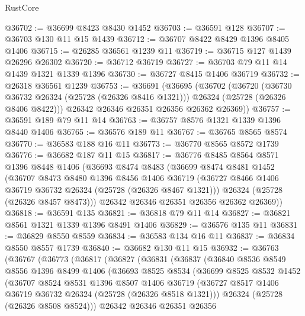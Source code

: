 \begin{lexlean}{RustCore}
\begin{coremodule}
@36702 := @36699 @8423 @8430 @1452
@36703 := @36591 @128
@36707 := @36703 @130 @11 @15 @1439
@36712 := @36707 @8422 @8429 @1396 @8405 @1406
@36715 := @26285 @36561 @1239 @11
@36719 := @36715 @127 @1439 @26296 @26302
@36720 := @36712 @36719
@36727 := @36703 @79 @11 @14 @1439 @1321 @1339 @1396
@36730 := @36727 @8415 @1406 @36719
@36732 := @26318 @36561 @1239
@36753 := @36691
    (@36695
      (@36702
        (@36720
          (@36730 @36732 @26324 (@25728 (@26326 @8416 @1321)))
          @26324
          (@25728 (@26326 @8406 @8422)))
        @26342
        @26346
        @26351
        @26356
        @26362
        @26369))
@36757 := @36591 @189 @79 @11 @14
@36763 := @36757 @8576 @1321 @1339 @1396 @8440 @1406
@36765 := @36576 @189 @11
@36767 := @36765 @8565 @8574
@36770 := @36583 @188 @16 @11
@36773 := @36770 @8565 @8572 @1739
@36776 := @36682 @187 @11 @15
@36817 := @36776
    @8485
    @8564
    @8571
    @1396
    @8448
    @1406
    (@36693
      @8474
      @8483
      (@36699
        @8474
        @8481
        @1452
        (@36707
          @8473
          @8480
          @1396
          @8456
          @1406
          @36719
          (@36727 @8466 @1406 @36719 @36732 @26324 (@25728 (@26326 @8467 @1321)))
          @26324
          (@25728 (@26326 @8457 @8473)))
        @26342
        @26346
        @26351
        @26356
        @26362
        @26369))
@36818 := @36591 @135
@36821 := @36818 @79 @11 @14
@36827 := @36821 @8561 @1321 @1339 @1396 @8491 @1406
@36829 := @36576 @135 @11
@36831 := @36829 @8550 @8559
@36834 := @36583 @134 @16 @11
@36837 := @36834 @8550 @8557 @1739
@36840 := @36682 @130 @11 @15
@36932 := @36763
    (@36767
      (@36773
        (@36817
          (@36827
            (@36831
              (@36837
                (@36840
                  @8536
                  @8549
                  @8556
                  @1396
                  @8499
                  @1406
                  (@36693
                    @8525
                    @8534
                    (@36699
                      @8525
                      @8532
                      @1452
                      (@36707
                        @8524
                        @8531
                        @1396
                        @8507
                        @1406
                        @36719
                        (@36727 @8517 @1406 @36719 @36732 @26324 (@25728 (@26326 @8518 @1321)))
                        @26324
                        (@25728 (@26326 @8508 @8524)))
                      @26342
                      @26346
                      @26351
                      @26356

\end{coremodule}
\end{lexlean}
